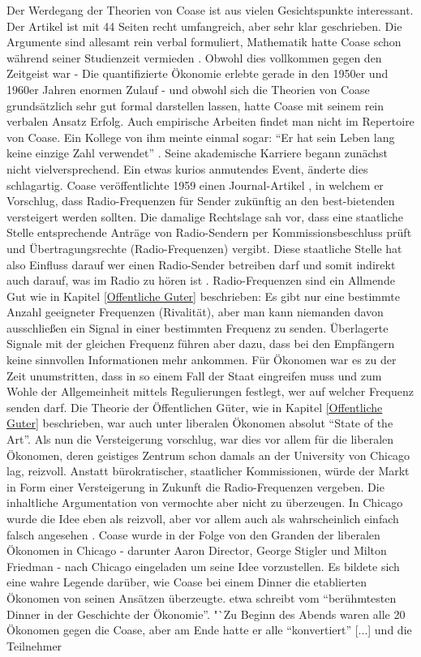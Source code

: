 Der Werdegang der Theorien von Coase ist aus vielen Gesichtspunkte interessant. Der Artikel \textcite{Coase1960} ist mit 44 Seiten recht umfangreich, aber sehr klar geschrieben. Die Argumente sind allesamt rein verbal formuliert, Mathematik hatte Coase schon während seiner Studienzeit vermieden \parencite{Coase1991a}. Obwohl dies vollkommen gegen den Zeitgeist war - Die quantifizierte Ökonomie erlebte gerade in den 1950er und 1960er Jahren enormen Zulauf - und obwohl sich die Theorien von Coase grundsätzlich sehr gut formal darstellen lassen, hatte Coase mit seinem rein verbalen Ansatz Erfolg. Auch empirische Arbeiten findet man nicht im Repertoire von Coase. Ein Kollege von ihm meinte einmal sogar: "`Er hat sein Leben lang keine einzige Zahl verwendet"' \parencite[S. 111]{Warsh}. Seine akademische Karriere begann zunächst nicht vielversprechend. Ein etwas kurios anmutendes Event, änderte dies schlagartig. Coase veröffentlichte 1959 einen Journal-Artikel \parencite{Coase1959}, in welchem er Vorschlug, dass Radio-Frequenzen für Sender zukünftig an den best-bietenden versteigert werden sollten. Die damalige Rechtslage sah vor, dass eine staatliche Stelle entsprechende Anträge von Radio-Sendern per Kommissionsbeschluss prüft und Übertragungsrechte (Radio-Frequenzen) vergibt. Diese staatliche Stelle hat also Einfluss darauf wer einen Radio-Sender betreiben darf und somit indirekt auch darauf, was im Radio zu hören ist \parencite[S. 879]{Coase1959}. Radio-Frequenzen sind ein Allmende Gut wie in Kapitel \ref{Offentliche Guter} beschrieben: Es gibt nur eine bestimmte Anzahl geeigneter Frequenzen (Rivalität), aber man kann niemanden davon ausschließen ein Signal in einer bestimmten Frequenz zu senden. Überlagerte Signale mit der gleichen Frequenz führen aber dazu, dass bei den Empfängern keine sinnvollen Informationen mehr ankommen. Für Ökonomen war es zu der Zeit unumstritten, dass in so einem Fall der Staat eingreifen muss und zum Wohle der Allgemeinheit mittels Regulierungen festlegt, wer auf welcher Frequenz senden darf. Die Theorie der Öffentlichen Güter, wie in Kapitel \ref{Offentliche Guter} beschrieben, war auch unter liberalen Ökonomen absolut "`State of the Art"'. Als \textcite{Coase1959} nun die Versteigerung vorschlug, war dies vor allem für die liberalen Ökonomen, deren geistiges Zentrum schon damals an der University von Chicago lag, reizvoll. Anstatt bürokratischer, staatlicher Kommissionen, würde der Markt in Form einer Versteigerung in Zukunft die Radio-Frequenzen vergeben. Die inhaltliche Argumentation von \textcite{Coase1959} vermochte aber nicht zu überzeugen. In Chicago wurde die Idee eben als reizvoll, aber vor allem auch als wahrscheinlich einfach falsch angesehen \parencite{Coase1991a}. Coase wurde in der Folge von den Granden der liberalen Ökonomen in Chicago - darunter Aaron Director, George Stigler und Milton Friedman - nach Chicago eingeladen um seine Idee vorzustellen. Es bildete sich eine wahre Legende \parencite[S. 113]{Warsh} darüber, wie Coase bei einem Dinner die etablierten Ökonomen von seinen Ansätzen überzeugte. \textcite[S. 45]{Schlafly2007} etwa schreibt vom "`berühmtesten Dinner in der Geschichte der Ökonomie"'. "`Zu Beginn des Abends waren alle 20 Ökonomen gegen die Coase, aber am Ende hatte er alle "`konvertiert"' [...] und die Teilnehmer 